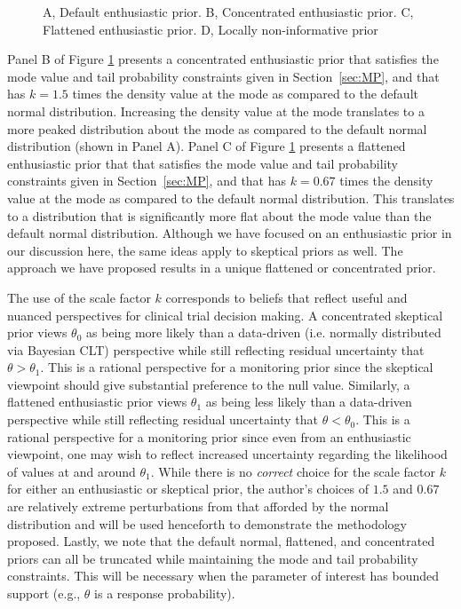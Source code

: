 \documentclass[useAMS,usenatbib,referee]{biom}
\begin{document}
\begin{figure}
\begin{center}
\caption{A, Default enthusiastic prior. B, Concentrated enthusiastic prior. C, Flattened enthusiastic prior. D, Locally non-informative prior}

\label{fig:figure1}
\end{center}
\end{figure}

{Panel B of Figure \ref{fig:figure1} presents a concentrated enthusiastic prior that satisfies 
the mode value and tail probability constraints given in Section~\ref{sec:MP}, and that has $k=1.5$ times the density value at the mode as compared to the default normal distribution. 
Increasing the density value at the mode translates to a more peaked distribution about the mode as compared to the default normal distribution (shown in Panel A). 
%
Panel C of Figure \ref{fig:figure1} presents a flattened enthusiastic prior that that satisfies the mode value and tail probability constraints given in Section~\ref{sec:MP}, and
that has $k=0.67$ times the density value at the mode as compared to the default normal distribution. This translates to a distribution that is significantly more flat about the mode value than the default normal distribution. 
%
Although we have focused on an enthusiastic prior in our discussion here, the same ideas apply to skeptical priors as well.
%
The approach we have proposed results in a unique flattened or concentrated prior.

The use of the scale factor $k$ corresponds to beliefs that reflect useful and nuanced perspectives for clinical trial decision making.
%
A concentrated skeptical prior views $\theta_0$ as being more likely than a data-driven (i.e. normally distributed via Bayesian CLT) perspective while still reflecting residual uncertainty that $\theta>\theta_1$.
%
This is a rational perspective for a monitoring prior since the skeptical viewpoint should give substantial preference to the null value.
%
Similarly, a flattened enthusiastic prior views $\theta_1$ as being less likely than a data-driven perspective while still reflecting residual uncertainty that $\theta<\theta_0$.
%
This is a rational perspective for a monitoring prior since even from an enthusiastic viewpoint, one may wish to reflect increased uncertainty regarding the likelihood of values at and around $\theta_1$.
%
While there is no \textit{correct} choice for the scale factor $k$ for either an enthusiastic or skeptical prior, the author's choices
of $1.5$ and $0.67$ are relatively extreme perturbations from that afforded by the normal distribution and will be used henceforth to 
demonstrate the methodology proposed. 
Lastly, we note that the default normal, flattened, and concentrated priors can all be truncated while maintaining the mode and tail 
probability constraints.
This will be necessary when the parameter of interest has bounded support (e.g., $\theta$ is a response probability).
}
\end{document}
